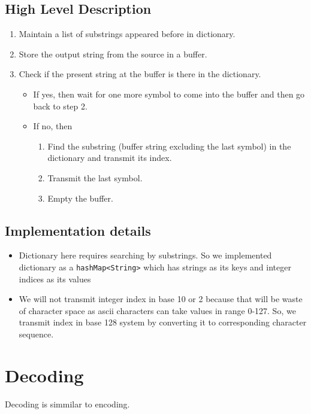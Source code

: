 \documentclass[a4paper]{article}
\begin{document}
    \subsection{High Level Description}
        \begin{enumerate}
        \item Maintain a list of substrings appeared before in dictionary.
        \item Store the output string from the source in a buffer.
        \item Check if the present string at the buffer is there in the dictionary.
          \begin{itemize}
          \item If yes, then wait for one more symbol to come into the buffer and then go back to step 2.
          \item If no, then 
        		\begin{enumerate}
                \item Find the substring (buffer string excluding the last symbol) in the dictionary and transmit its index. 
                \item Transmit the last symbol. 
                \item Empty the buffer.
        \end {enumerate}
        \end{itemize}
        \end{enumerate}


    \subsection {Implementation details}
        \begin{itemize}
        \item Dictionary here requires searching by substrings. So we implemented dictionary as a \texttt{hashMap<String>} which has strings as its keys and integer indices as its values
        \item We will not transmit integer index in base 10 or 2 because that will be waste of character space as ascii characters can take values in range 0-127. So, we transmit index in base 128 system by converting it to corresponding character sequence.
        \end{itemize}


\section{Decoding}
Decoding is simmilar to encoding.
\end{document}
